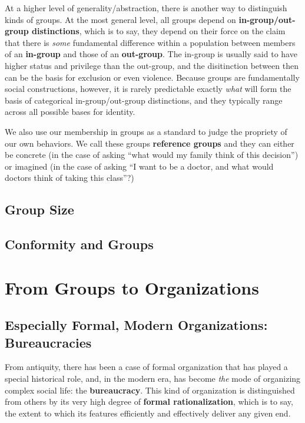 \documentclass[
  letterpaper,
  DIV=11,
  numbers=noendperiod,
  oneside]{scrartcl}
\begin{document}
At a higher level of generality/abstraction, there is another way to
distinguish kinds of groups. At the most general level, all groups
depend on \textbf{in-group/out-group distinctions}, which is to say,
they depend on their force on the claim that there is \emph{some}
fundamental difference within a population between members of an
\textbf{in-group} and those of an \textbf{out-group}. The in-group is
usually said to have higher status and privilege than the out-group, and
the disitinction between then can be the basis for exclusion or even
violence. Because groups are fundamentally social constructions,
however, it is rarely predictable exactly \emph{what} will form the
basis of categorical in-group/out-group distinctions, and they typically
range across all possible bases for identity.

We also use our membership in groups as a standard to judge the
propriety of our own behaviors. We call these groups \textbf{reference
groups} and they can either be concrete (in the case of asking ``what
would my family think of this decision'') or imagined (in the case of
asking ``I want to be a doctor, and what would doctors think of taking
this class''?)

\subsection{Group Size}\label{group-size}

\subsection{Conformity and Groups}\label{conformity-and-groups}

\section{From Groups to
Organizations}\label{from-groups-to-organizations}

\subsection{Especially Formal, Modern Organizations:
Bureaucracies}\label{especially-formal-modern-organizations-bureaucracies}

From antiquity, there has been a case of formal organization that has
played a special historical role, and, in the modern era, has become
\emph{the} mode of organizing complex social life: the
\textbf{bureaucracy}. This kind of organization is distinguished from
others by its very high degree of \textbf{formal rationalization}, which
is to say, the extent to which its features efficiently and effectively
deliver any given end.
\end{document}
